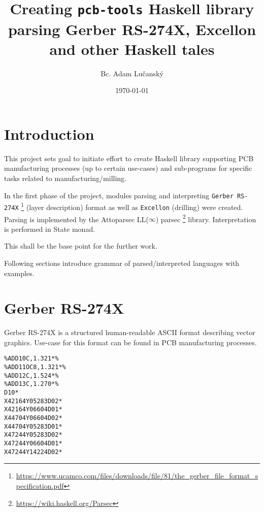 \documentclass[12pt,a4paper]{article}
\begin{document}
\title{\vspace{-2.0cm} Creating \texttt{pcb-tools} Haskell library 
				\\ \small{parsing Gerber RS-274X, Excellon and other Haskell tales}}
\author{Bc. Adam Lučanský}
\date{\today}
\maketitle
{}

\section{Introduction}
This project sets goal to initiate effort to create Haskell library supporting PCB manufacturing processes (up to certain use-cases) and sub-programs for specific tasks related to manufacturing/milling.

In the first phase of the project, modules parsing and interpreting \texttt{Gerber RS-274X} \footnote{\url{https://www.ucamco.com/files/downloads/file/81/the_gerber_file_format_specification.pdf}} (layer description) format as well as \texttt{Excellon} (drilling) were created.
Parsing is implemented by the Attoparsec LL($\infty$) parsec \footnote{\url{https://wiki.haskell.org/Parsec}} library. Interpretation is performed in State monad.

This shall be the base point for the further work.

Following sections introduce grammar of parsed/interpreted languages with examples.

\section{Gerber RS-274X}
Gerber RS-274X is a structured human-readable ASCII format describing vector graphics. Use-case for this format can be found in PCB manufacturing processes.

\newpage %
\lstset{language=bash}
\lstset{frame=lines}
\lstset{basicstyle=\footnotesize\ttfamily}
\begin{lstlisting}
%ADD10C,1.321*%
%ADD11OC8,1.321*%
%ADD12C,1.524*%
%ADD13C,1.270*%
D10*
X42164Y05283D02*
X42164Y06604D01*
X44704Y06604D02*
X44704Y05283D01*
X47244Y05283D02*
X47244Y06604D01*
X47244Y14224D02*
\end{lstlisting}
\end{document}
